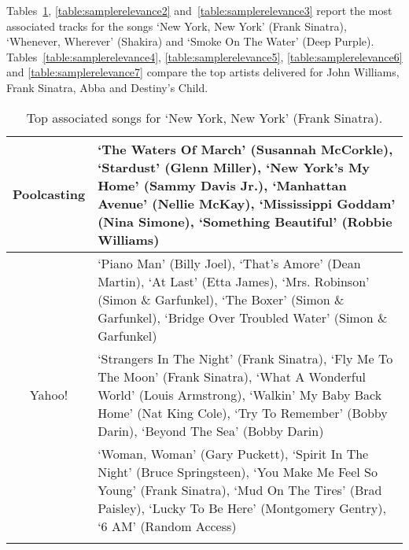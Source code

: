 Tables~\ref{table:samplerelevance}, \ref{table:samplerelevance2} and~\ref{table:samplerelevance3} report the most associated tracks for the songs `New York, New York' (Frank Sinatra), `Whenever, Wherever' (Shakira) and `Smoke On The Water' (Deep Purple).
Tables~\ref{table:samplerelevance4}, \ref{table:samplerelevance5}, \ref{table:samplerelevance6} and \ref{table:samplerelevance7} compare the top artists delivered for John Williams, Frank Sinatra, Abba and Destiny's Child. 

\begin{table}[bthp]\centering
\setlength{\extrarowheight}{3pt}
\setlength{\abovecaptionskip}{3pt}
\setlength{\belowcaptionskip}{3pt}
\setlength{\intextsep}{0pt}
\caption{Top associated songs for `New York, New York' (Frank Sinatra).}\label{table:samplerelevance}
{\fontsize{8}{10}\selectfont
\begin{tabular}{|c|p{}|}
 \hline 
 \multirow{3}{*}{Poolcasting} &
 `The Waters Of March' (Susannah McCorkle), `Stardust' (Glenn Miller), `New York's My Home' (Sammy Davis Jr.), `Manhattan Avenue' (Nellie McKay), `Mississippi Goddam' (Nina Simone), `Something Beautiful' (Robbie Williams) \vspace{2pt} \\
 \hline
 \multirow{3}{*}{Yahoo!} &
 `Piano Man' (Billy Joel), `That's Amore'	(Dean Martin), `At Last' (Etta James), `Mrs. Robinson'	(Simon \& Garfunkel), `The Boxer' (Simon \& Garfunkel), `Bridge Over Troubled Water' (Simon \& Garfunkel) \vspace{2pt} \\
 \hline
 \multirow{3}{*}{Last.fm} &
 `Strangers In The Night' (Frank Sinatra), `Fly Me To The Moon'	(Frank Sinatra), `What A Wonderful World' (Louis Armstrong), `Walkin' My Baby Back Home'	(Nat King Cole), `Try To Remember' (Bobby Darin), `Beyond The Sea' (Bobby Darin) \vspace{2pt} \\
 \hline
 \multirow{3}{*}{Audiobaba} &
 `Woman, Woman' (Gary Puckett), `Spirit In The Night'	(Bruce Springsteen), `You Make Me Feel So Young' (Frank Sinatra), `Mud On The Tires'	(Brad Paisley), `Lucky To Be Here' (Montgomery Gentry), `6 AM' (Random Access) \vspace{2pt} \\
 \hline
 \noalign{\bigskip}
\end{tabular}}
\end{table}
